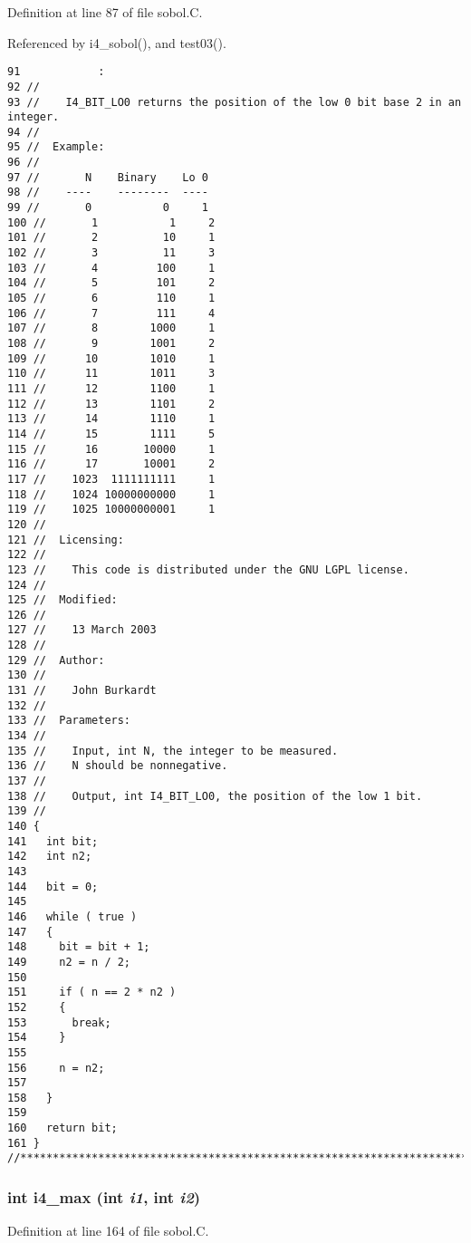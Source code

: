 Definition at line 87 of file sobol.C.

Referenced by i4\_\-sobol(), and test03().

\begin{Code}\begin{verbatim}91            :
92 //
93 //    I4_BIT_LO0 returns the position of the low 0 bit base 2 in an integer.
94 //
95 //  Example:
96 //
97 //       N    Binary    Lo 0
98 //    ----    --------  ----
99 //       0           0     1
100 //       1           1     2
101 //       2          10     1
102 //       3          11     3 
103 //       4         100     1
104 //       5         101     2
105 //       6         110     1
106 //       7         111     4
107 //       8        1000     1
108 //       9        1001     2
109 //      10        1010     1
110 //      11        1011     3
111 //      12        1100     1
112 //      13        1101     2
113 //      14        1110     1
114 //      15        1111     5
115 //      16       10000     1
116 //      17       10001     2
117 //    1023  1111111111     1
118 //    1024 10000000000     1
119 //    1025 10000000001     1
120 //
121 //  Licensing:
122 //
123 //    This code is distributed under the GNU LGPL license. 
124 //
125 //  Modified:
126 //
127 //    13 March 2003
128 //
129 //  Author:
130 //
131 //    John Burkardt
132 //
133 //  Parameters:
134 //
135 //    Input, int N, the integer to be measured.
136 //    N should be nonnegative.
137 //
138 //    Output, int I4_BIT_LO0, the position of the low 1 bit.
139 //
140 {
141   int bit;
142   int n2;
143 
144   bit = 0;
145 
146   while ( true )
147   {
148     bit = bit + 1;
149     n2 = n / 2;
150 
151     if ( n == 2 * n2 )
152     {
153       break;
154     }
155 
156     n = n2;
157 
158   }
159 
160   return bit;
161 }
//****************************************************************************80
\end{verbatim}
\end{Code}


\subsubsection{\setlength{\rightskip}{0pt plus 5cm}int i4\_\-max (int {\em i1}, int {\em i2})}\label{sobol_8C_36f800e4593bdd258feaeb43cf42adf7}




Definition at line 164 of file sobol.C.

